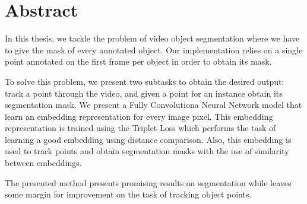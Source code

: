 
\chapter*{Abstract}
\label{cha:abstract}

In this thesis, we tackle the problem of video object segmentation where we have to give the mask of every annotated object.
Our implementation relies on a single point annotated on the first frame per object in order to obtain its mask.

To solve this problem, we present two subtasks to obtain the desired output: 
track a point through the video,
and given a point for an instance obtain its segmentation mask.
We present a Fully Convolutiona Neural Network model that learn an embedding representation for every image pixel.
This embedding representation is trained using the Triplet Loss which performs the task of learning a good embedding using distance comparison.
Also, this embedding is used to track points and obtain segmentation masks with the use of similarity between embeddings.

The presented method presents promising results on segmentation while leaves some margin for improvement on the task of tracking object points.
